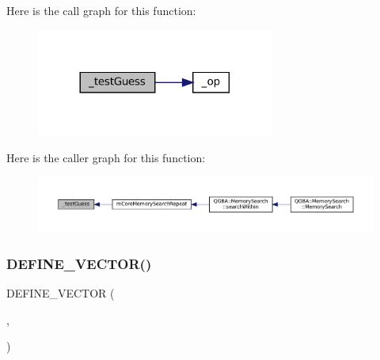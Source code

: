 Here is the call graph for this function\+:
\nopagebreak
\begin{figure}[H]
\begin{center}
\leavevmode
\includegraphics[width=221pt]{mem-search_8c_abe2e1ea41c6228bb5bcb7af4f001f543_cgraph}
\end{center}
\end{figure}
Here is the caller graph for this function\+:
\nopagebreak
\begin{figure}[H]
\begin{center}
\leavevmode
\includegraphics[width=350pt]{mem-search_8c_abe2e1ea41c6228bb5bcb7af4f001f543_icgraph}
\end{center}
\end{figure}
\mbox{\label{mem-search_8c_a9dc0a4130b34dc202f454726953c1754}} 
\subsubsection{\texorpdfstring{D\+E\+F\+I\+N\+E\+\_\+\+V\+E\+C\+T\+O\+R()}{DEFINE\_VECTOR()}}
{\footnotesize\ttfamily D\+E\+F\+I\+N\+E\+\_\+\+V\+E\+C\+T\+OR (\begin{DoxyParamCaption}\item[{m\+Core\+Memory\+Search\+Results}]{,  }\item[{struct m\+Core\+Memory\+Search\+Result}]{ }\end{DoxyParamCaption})}

\mbox{\label{mem-search_8c_ada9f367c156717a3e0f6475e27a9c970}} 
